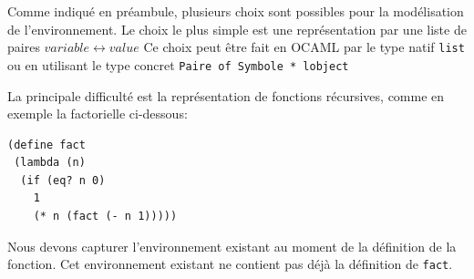 \documentclass[11pt]{book}
\begin{document}
Comme indiqu\'{e} en pr\'{e}ambule, plusieurs choix sont possibles pour la mod\'{e}lisation de l'environnement.
Le choix le plus simple est une repr\'{e}sentation par une liste de paires $variable \leftrightarrow  value$
Ce choix peut être fait en OCAML par le type natif \verb+list+ ou en utilisant le type concret \verb+Paire of Symbole * lobject+

La principale difficulté est la représentation de fonctions récursives, comme en exemple la factorielle ci-dessous:
\begin{Verbatim}
(define fact 
 (lambda (n) 
  (if (eq? n 0) 
    1
    (* n (fact (- n 1)))))
\end{Verbatim}
Nous devons capturer l'environnement existant au moment de la définition de la fonction.
Cet environnement existant ne contient pas déjà la définition de \verb+fact+.
\end{document}
